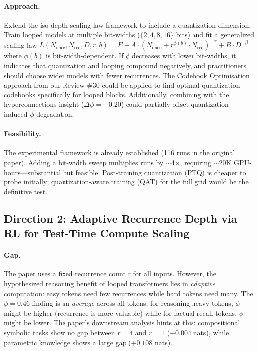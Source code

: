 \documentclass[11pt]{article}
\begin{document}
\paragraph{Approach.}
Extend the iso-depth scaling law framework to include a quantization dimension. Train looped models at multiple bit-widths ($\{2, 4, 8, 16\}$ bits) and fit a generalized scaling law $L(N_{\mathrm{once}}, N_{\mathrm{rec}}, D, r, b) = E + A \cdot (N_{\mathrm{once}} + r^{\phi(b)} \cdot N_{\mathrm{rec}})^{-\alpha} + B \cdot D^{-\beta}$ where $\phi(b)$ is bit-width-dependent. If $\phi$ decreases with lower bit-widths, it indicates that quantization and looping compound negatively, and practitioners should choose wider models with fewer recurrences. The Codebook Optimisation approach from our Review \#30 could be applied to find optimal quantization codebooks specifically for looped blocks. Additionally, combining with the hyperconnections insight ($\Delta\phi = +0.20$) could partially offset quantization-induced $\phi$ degradation.

\paragraph{Feasibility.}
The experimental framework is already established (116 runs in the original paper). Adding a bit-width sweep multiplies runs by $\sim$4$\times$, requiring $\sim$20K GPU-hours---substantial but feasible. Post-training quantization (PTQ) is cheaper to probe initially; quantization-aware training (QAT) for the full grid would be the definitive test.

\subsection{Direction 2: Adaptive Recurrence Depth via RL for Test-Time Compute Scaling}

\paragraph{Gap.}
The paper uses a fixed recurrence count $r$ for all inputs. However, the hypothesized reasoning benefit of looped transformers lies in \emph{adaptive} computation: easy tokens need few recurrences while hard tokens need many. The $\phi = 0.46$ finding is an \emph{average} across all tokens; for reasoning-heavy tokens, $\phi$ might be higher (recurrence is more valuable) while for factual-recall tokens, $\phi$ might be lower. The paper's downstream analysis hints at this: compositional symbolic tasks show no gap between $r{=}4$ and $r{=}1$ ($-0.004$ nats), while parametric knowledge shows a large gap ($+0.108$ nats).
\end{document}
